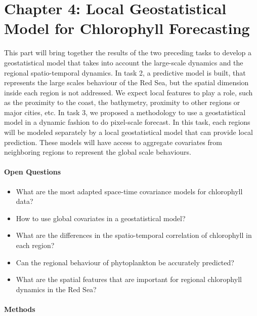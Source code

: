 \section{Chapter 4: Local Geostatistical Model for Chlorophyll Forecasting}

This part will bring together the results of the two preceding tasks to develop
a geostatistical model that takes into account the large-scale dynamics and the
regional spatio-temporal dynamics. In task 2, a predictive model is built, that
represents the large scales behaviour of the Red Sea, but the spatial dimension
inside each region is not addressed. We expect local features to play a role,
such as the proximity to the coast, the bathymetry, proximity to other regions
or major cities, etc. In task 3, we proposed a methodology to use a
geostatistical model in a dynamic fashion to do pixel-scale forecast. In this
task, each regions will be modeled separately by a local geostatistical model
that can provide local prediction. These models will have access to aggregate
covariates from neighboring regions to represent the global scale behaviours. 

\paragraph{Open Questions}

\begin{itemize}

\item What are the most adapted space-time covariance models for chlorophyll
data?

\item How to use global covariates in a geostatistical model?

\item What are the differences in the spatio-temporal correlation of
chlorophyll in each region?

\item Can the regional behaviour of phytoplankton be accurately predicted?

\item What are the spatial features that are important for regional chlorophyll
dynamics in the Red Sea?

\end{itemize}

\paragraph{Methods}


